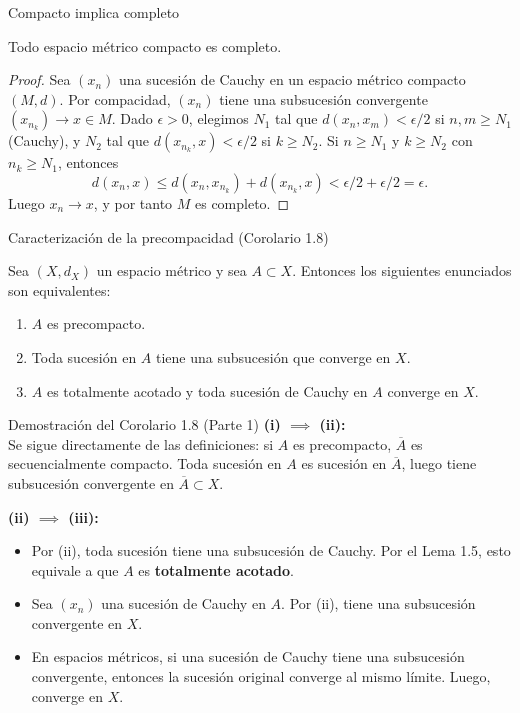 \begin{frame}{Compacto implica completo}
    \begin{teorema}
        Todo espacio métrico compacto es completo.
    \end{teorema}
    \vspace{0.3cm}
    \begin{proof}
        Sea $(x_n)$ una sucesión de Cauchy en un espacio métrico compacto $(M,d)$. Por compacidad, $(x_n)$ tiene una subsucesión convergente $(x_{n_k})\to x\in M$.
        Dado $\epsilon>0$, elegimos $N_1$ tal que $d(x_n,x_m)<\epsilon/2$ si $n,m\ge N_1$ (Cauchy), y $N_2$ tal que $d(x_{n_k},x)<\epsilon/2$ si $k\ge N_2$.
        Si $n\ge N_1$ y $k\ge N_2$ con $n_k\ge N_1$, entonces
        \[
            d(x_n,x)\le d(x_n,x_{n_k})+d(x_{n_k},x)<\epsilon/2+\epsilon/2=\epsilon.
        \]
        Luego $x_n\to x$, y por tanto $M$ es completo.
    \end{proof}
\end{frame}

\begin{frame}{Caracterización de la precompacidad (Corolario 1.8)}
    \begin{corolario}
        Sea $(X, d_X)$ un espacio métrico y sea $A \subset X$. Entonces los siguientes enunciados son equivalentes:
        \begin{enumerate}
            \item[(i)] $A$ es precompacto.
            \item[(ii)] Toda sucesión en $A$ tiene una subsucesión que converge en $X$.
            \item[(iii)] $A$ es totalmente acotado y toda sucesión de Cauchy en $A$ converge en $X$.
        \end{enumerate}
    \end{corolario}
\end{frame}

\begin{frame}{Demostración del Corolario 1.8 (Parte 1)}
    \textbf{(i) $\implies$ (ii):}\\
    Se sigue directamente de las definiciones: si $A$ es precompacto, $\overline{A}$ es secuencialmente compacto. Toda sucesión en $A$ es sucesión en $\overline{A}$, luego tiene subsucesión convergente en $\overline{A} \subset X$.

    \vspace{0.3cm}
    \textbf{(ii) $\implies$ (iii):}
    \begin{itemize}
        \item Por (ii), toda sucesión tiene una subsucesión de Cauchy. Por el Lema 1.5, esto equivale a que $A$ es \textbf{totalmente acotado}.
        \item Sea $(x_n)$ una sucesión de Cauchy en $A$. Por (ii), tiene una subsucesión convergente en $X$.
        \item En espacios métricos, si una sucesión de Cauchy tiene una subsucesión convergente, entonces la sucesión original converge al mismo límite. Luego, converge en $X$.
    \end{itemize}
\end{frame}


